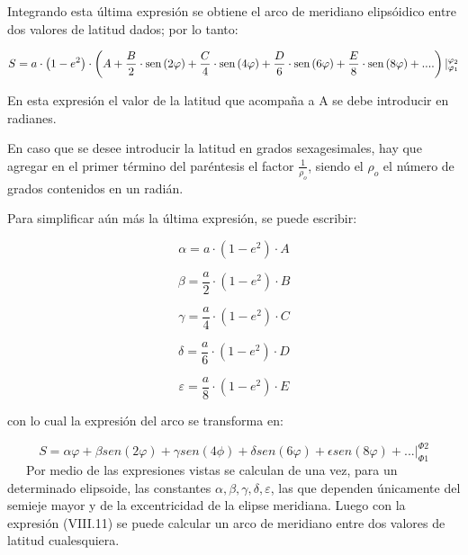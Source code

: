 \documentclass{tufte-book}
\newcommand\normalsubformula[1]{\text{\mathversion{normal}$#1$}}
\begin{document}
Integrando esta última expresión se obtiene el arco de meridiano
elipsóidico entre dos valores de latitud dados; por lo tanto:

\begin{equation*}
{S=a\cdot \left(1-e^{{2}}\right)\cdot \left(A+\frac{B}{2}\cdot
\normalsubformula{\text{sen}}\left(2\varphi \right)+\frac{C}{4}\cdot
\normalsubformula{\text{sen}}\left(4\varphi \right)+\frac{D}{6}\cdot
\normalsubformula{\text{sen}}\left(6\varphi \right)+\frac{E}{8}\cdot
\normalsubformula{\text{sen}}\left(8\varphi
\right)+\text{.}\text{.}\text{.}\text{.}\right)|_{{\varphi
_{{1}}}}^{\varphi _{{2}}}}
\end{equation*}

En esta expresión el valor de la latitud que acompa\~na a A se debe
introducir en radianes.

En caso que se desee introducir la latitud en grados sexagesimales, hay
que agregar en el primer término del paréntesis el factor 
${\frac{1}{\rho _{{o}}}}$, siendo el  ${\rho _{{o}}}$ el número de
grados contenidos en un radián.

Para simplificar aún más la última expresión, se puede escribir:

\begin{equation*}
{\alpha =a\cdot \left(1-e^{{2}}\right)\cdot A}
\end{equation*}

\begin{equation*}
{\beta =\frac{a}{2}\cdot \left(1-e^{{2}}\right)\cdot B}
\end{equation*}

\begin{equation*}
{\gamma =\frac{a}{4}\cdot \left(1-e^{{2}}\right)\cdot C}
\end{equation*}

\begin{equation*}
{\delta =\frac{a}{6}\cdot \left(1-e^{{2}}\right)\cdot D}
\end{equation*}

\begin{equation*}
{\varepsilon =\frac{a}{8}\cdot \left(1-e^{{2}}\right)\cdot E}
\end{equation*}

con lo cual la expresión del arco se transforma en:

\begin{equation*}
S=\alpha \varphi + \beta sen (2\varphi) + \gamma sen (4\phi) + \delta sen (6\varphi) + \epsilon sen (8\varphi) + ... |_{\Phi1}^{\Phi2}
\end{equation*}
\
\ \ Por medio de las expresiones vistas se calculan de una vez, para un
determinado elipsoide, las constantes  ${\alpha ,\beta ,\gamma ,\delta
,\varepsilon }$, las que dependen únicamente del semieje mayor y de
la excentricidad de la elipse meridiana. Luego con la expresión
(VIII.11) se puede calcular un arco de meridiano entre dos valores de
latitud cualesquiera.
\end{document}
